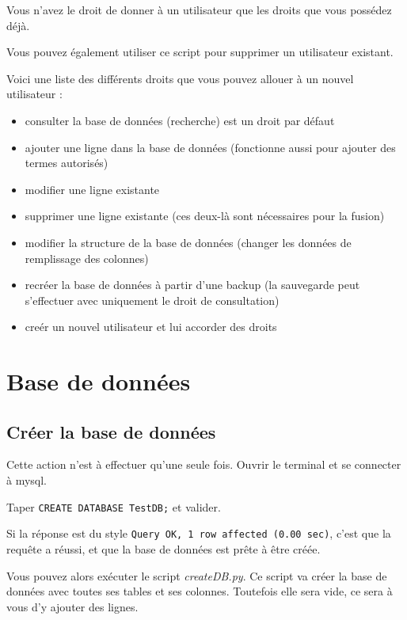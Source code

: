 \documentclass[12pt,a4paper]{article}
\begin{document}
        Vous n'avez le droit de donner à un utilisateur que les droits que vous possédez déjà.

        Vous pouvez également utiliser ce script pour supprimer un utilisateur existant.

        Voici une liste des différents droits que vous pouvez allouer à un nouvel utilisateur :
        \begin{itemize}
            \item consulter la base de données (recherche) est un droit par défaut
            \item ajouter une ligne dans la base de données (fonctionne aussi pour ajouter des termes autorisés)
            \item modifier une ligne existante
            \item supprimer une ligne existante (ces deux-là sont nécessaires pour la fusion)
            \item modifier la structure de la base de données (changer les données de remplissage des colonnes)
            \item recréer la base de données à partir d'une backup (la sauvegarde peut s'effectuer avec uniquement le droit de consultation)
            \item creér un nouvel utilisateur et lui accorder des droits
        \end{itemize}




\clearpage
\section{Base de données}

    \subsection{Créer la base de données}\label{createdb}

        Cette action n'est à effectuer qu'une seule fois.
        Ouvrir le terminal %
        et se connecter à mysql.

        Taper \verb+CREATE DATABASE TestDB;+ et valider.
    
        Si la réponse est du style \verb+Query OK, 1 row affected (0.00 sec)+, c'est
        que la requête a réussi, et que la base de données est prête à être créée.

        Vous pouvez alors exécuter le script \emph{createDB.py}. Ce script va créer
        la base de données avec toutes ses tables et ses colonnes. Toutefois elle
        sera vide, ce sera à vous d'y ajouter des lignes.
\end{document}

